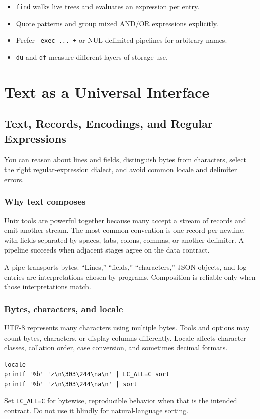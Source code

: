 \documentclass[11pt,oneside,openany]{book}
\newcommand{\chaptergoals}[1]{%
  \begin{tcolorbox}[colback=Paper,colframe=Blue,title={Learning outcomes},fonttitle=\bfseries]
  #1
  \end{tcolorbox}}
\begin{document}
\begin{recapbox}
\begin{itemize}
  \item \texttt{find} walks live trees and evaluates an expression per entry.
  \item Quote patterns and group mixed AND/OR expressions explicitly.
  \item Prefer \texttt{-exec ... {} +} or NUL-delimited pipelines for arbitrary names.
  \item \texttt{du} and \texttt{df} measure different layers of storage use.
\end{itemize}
\end{recapbox}

\part{Text as a Universal Interface}

\chapter{Text, Records, Encodings, and Regular Expressions}
\chaptergoals{You can reason about lines and fields, distinguish bytes from characters, select the right regular-expression dialect, and avoid common locale and delimiter errors.}

\section{Why text composes}
Unix tools are powerful together because many accept a stream of records and emit another stream. The most common convention is one record per newline, with fields separated by spaces, tabs, colons, commas, or another delimiter. A pipeline succeeds when adjacent stages agree on the data contract.

\begin{mentalmodel}
A pipe transports bytes. “Lines,” “fields,” “characters,” JSON objects, and log entries are interpretations chosen by programs. Composition is reliable only when those interpretations match.
\end{mentalmodel}

\section{Bytes, characters, and locale}
UTF-8 represents many characters using multiple bytes. Tools and options may count bytes, characters, or display columns differently. Locale affects character classes, collation order, case conversion, and sometimes decimal formats.
\begin{lstlisting}
locale
printf '%b' 'z\n\303\244\na\n' | LC_ALL=C sort
printf '%b' 'z\n\303\244\na\n' | sort
\end{lstlisting}
Set \texttt{LC\_ALL=C} for bytewise, reproducible behavior when that is the intended contract. Do not use it blindly for natural-language sorting.
\end{document}
